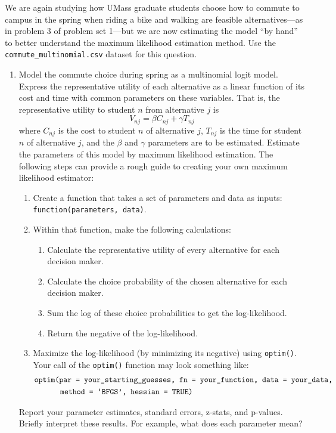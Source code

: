 \documentclass[11pt,letterpaper]{article}
\begin{document}
We are again studying how UMass graduate students choose how to commute to campus in the spring when riding a bike and walking are feasible alternatives---as in problem 3 of problem set 1---but we are now estimating the model ``by hand'' to better understand the maximum likelihood estimation method. Use the \texttt{commute\_multinomial.csv} dataset for this question.

\begin{enumerate}[label=\alph*., leftmargin=*]
	\item Model the commute choice during spring as a multinomial logit model. Express the representative utility of each alternative as a linear function of its cost and time with common parameters on these variables. That is, the representative utility to student $n$ from alternative $j$ is
	$$V_{nj} = \beta C_{nj} + \gamma T_{nj}$$
	where $C_{nj}$ is the cost to student $n$ of alternative $j$, $T_{nj}$ is the time for student $n$ of alternative $j$, and the $\beta$ and $\gamma$ parameters are to be estimated. Estimate the parameters of this model by maximum likelihood estimation. The following steps can provide a rough guide to creating your own maximum likelihood estimator:
	\begin{enumerate}[label=\Roman*.]
		\item Create a function that takes a set of parameters and data as inputs: \texttt{function(parameters, data)}.
		\item Within that function, make the following calculations:
		\begin{enumerate}[label=\roman*.]
			\item Calculate the representative utility of every alternative for each decision maker.
			\item Calculate the choice probability of the chosen alternative for each decision maker.
			\item Sum the log of these choice probabilities to get the log-likelihood.
			\item Return the negative of the log-likelihood.
		\end{enumerate}
		\item Maximize the log-likelihood (by minimizing its negative) using \texttt{optim()}. Your call of the \texttt{optim()} function may look something like:
		\begin{align*}
			&\text{\texttt{optim(par = your\_starting\_guesses, fn = your\_function, data = your\_data,}} \\
			& \qquad \quad \; \text{\texttt{method = `BFGS', hessian = TRUE)}}
		\end{align*}
	\end{enumerate}
	Report your parameter estimates, standard errors, z-stats, and p-values. Briefly interpret these results. For example, what does each parameter mean?


\end{enumerate}
\end{document}
